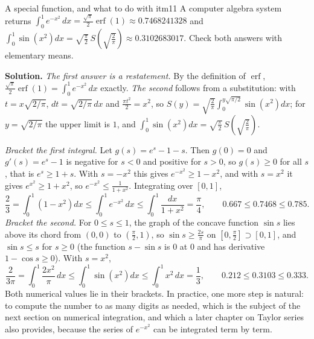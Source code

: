 \documentclass[11pt]{article}
\begin{document}
\begin{exmp}{A special function, and what to do with it}{m11}
A computer algebra system returns $\displaystyle\int_0^1e^{-x^2}\,dx=\frac{\sqrt\pi}2\operatorname{erf}(1)\approx0.7468241328$ and $\displaystyle\int_0^1\sin\left(x^2\right)dx=\sqrt{\frac\pi2}\,S\left(\sqrt{\frac2\pi}\right)\approx0.3102683017$. Check both answers with elementary means.

\textbf{Solution.} \emph{The first answer is a restatement.} By the definition of $\operatorname{erf}$, $\frac{\sqrt\pi}2\operatorname{erf}(1)=\int_0^1e^{-x^2}\,dx$ exactly. \emph{The second} follows from a substitution: with $t=x\sqrt{2/\pi}$, $dt=\sqrt{2/\pi}\,dx$ and $\frac{\pi t^2}2=x^2$, so $S(y)=\sqrt{\frac2\pi}\int_0^{y\sqrt{\pi/2}}\sin\left(x^2\right)dx$; for $y=\sqrt{2/\pi}$ the upper limit is $1$, and $\int_0^1\sin\left(x^2\right)dx=\sqrt{\frac\pi2}\,S\left(\sqrt{\frac2\pi}\right)$.

\emph{Bracket the first integral.} Let $g(s)=e^s-1-s$. Then $g(0)=0$ and $g'(s)=e^s-1$ is negative for $s<0$ and positive for $s>0$, so $g(s)\ge0$ for all $s$, that is $e^s\ge1+s$. With $s=-x^2$ this gives $e^{-x^2}\ge1-x^2$, and with $s=x^2$ it gives $e^{x^2}\ge1+x^2$, so $e^{-x^2}\le\frac1{1+x^2}$. Integrating over $[0,1]$,
\[\frac23=\int_0^1\left(1-x^2\right)dx\le\int_0^1e^{-x^2}\,dx\le\int_0^1\frac{dx}{1+x^2}=\frac\pi4,\qquad 0.667\le0.7468\le0.785 .\]
\emph{Bracket the second.} For $0\le s\le1$, the graph of the concave function $\sin s$ lies above its chord from $(0,0)$ to $\left(\frac\pi2,1\right)$, so $\sin s\ge\frac{2s}\pi$ on $\left[0,\frac\pi2\right]\supset[0,1]$, and $\sin s\le s$ for $s\ge0$ (the function $s-\sin s$ is $0$ at $0$ and has derivative $1-\cos s\ge0$). With $s=x^2$,
\[\frac2{3\pi}=\int_0^1\frac{2x^2}\pi\,dx\le\int_0^1\sin\left(x^2\right)dx\le\int_0^1x^2\,dx=\frac13,\qquad 0.212\le0.3103\le0.333 .\]
Both numerical values lie in their brackets. In practice, one more step is natural: to compute the number to as many digits as needed, which is the subject of the next section on numerical integration, and which a later chapter on Taylor series also provides, because the series of $e^{-x^2}$ can be integrated term by term.
\end{exmp}
\end{document}
